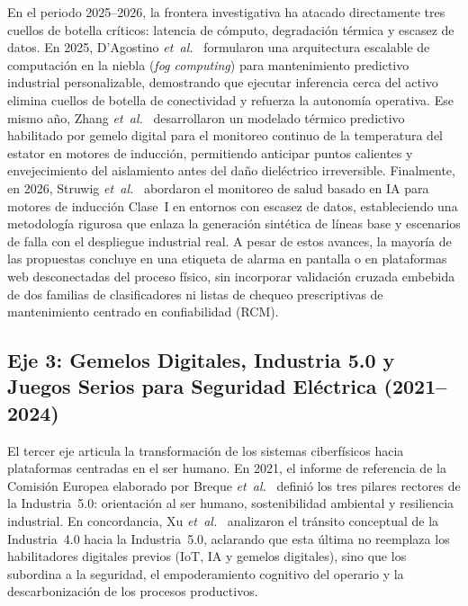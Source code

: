 En el periodo 2025--2026, la frontera investigativa ha atacado directamente tres cuellos de botella críticos: latencia de cómputo, degradación térmica y escasez de datos. En 2025, D'Agostino \emph{et~al.}~\cite{Fog2025} formularon una arquitectura escalable de computación en la niebla (\emph{fog computing}) para mantenimiento predictivo industrial personalizable, demostrando que ejecutar inferencia cerca del activo elimina cuellos de botella de conectividad y refuerza la autonomía operativa. Ese mismo año, Zhang \emph{et~al.}~\cite{Thermal2025} desarrollaron un modelado térmico predictivo habilitado por gemelo digital para el monitoreo continuo de la temperatura del estator en motores de inducción, permitiendo anticipar puntos calientes y envejecimiento del aislamiento antes del daño dieléctrico irreversible. Finalmente, en 2026, Struwig \emph{et~al.}~\cite{AI2026} abordaron el monitoreo de salud basado en IA para motores de inducción Clase~I en entornos con escasez de datos, estableciendo una metodología rigurosa que enlaza la generación sintética de líneas base y escenarios de falla con el despliegue industrial real. A pesar de estos avances, la mayoría de las propuestas concluye en una etiqueta de alarma en pantalla o en plataformas web desconectadas del proceso físico, sin incorporar validación cruzada embebida de dos familias de clasificadores ni listas de chequeo prescriptivas de mantenimiento centrado en confiabilidad (RCM).

\subsection{Eje 3: Gemelos Digitales, Industria 5.0 y Juegos Serios para Seguridad Eléctrica (2021--2024)}\label{subsec:eje3_i50_seguridad}

El tercer eje articula la transformación de los sistemas ciberfísicos hacia plataformas centradas en el ser humano. En 2021, el informe de referencia de la Comisión Europea elaborado por Breque \emph{et~al.}~\cite{Breque2021} definió los tres pilares rectores de la Industria~5.0: orientación al ser humano, sostenibilidad ambiental y resiliencia industrial. En concordancia, Xu \emph{et~al.}~\cite{Xu2021} analizaron el tránsito conceptual de la Industria~4.0 hacia la Industria~5.0, aclarando que esta última no reemplaza los habilitadores digitales previos (IoT, IA y gemelos digitales), sino que los subordina a la seguridad, el empoderamiento cognitivo del operario y la descarbonización de los procesos productivos.

